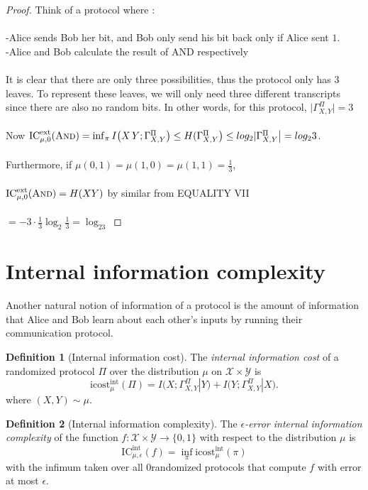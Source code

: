 \documentclass[11pt,oneside]{book}
\theoremstyle{plain}
\theoremstyle{definition}
\newtheorem{definition}{Definition}
\theoremstyle{plain}
\newcommand{\calX}{\mathcal{X}}
\newcommand{\calY}{\mathcal{Y}}
\newcommand{\ICext}{\mathrm{IC}^{\mathrm{ext}}}
\newcommand{\ICint}{\mathrm{IC}^{\mathrm{int}}}
\newcommand{\icostint}{\mathrm{icost}^{\mathrm{int}}}
\begin{document}
\begin{proof}
	Think of a protocol where :\\
	\\
	-Alice sends Bob her bit, and Bob only send his bit back only if Alice sent $1$.\\
	-Alice and Bob calculate the result of AND respectively \\
	\\
	It is clear that there are only three possibilities, thus the protocol only has $3$ leaves. To represent these leaves, we will only need three different transcripts since there are also no random bits. In other words, for this protocol, $|\Gamma_{X,Y}^\Pi \big| = 3$ \\
	\\
	Now $\ICext_{\mu,0}(\textsc{And}) = \inf_{\pi} I\big( X\,Y ; \Gamma_{X,Y}^\Pi \big) \le H(\Gamma_{X,Y}^\Pi \big) \le log_2|\Gamma_{X,Y}^\Pi \big| = log_23$.\\
	\\
	Furthermore, if $\mu(0,1) = \mu(1,0) = \mu(1,1) = \frac13$, \\
	\\
	$\ICext_{\mu,0}(\textsc{And}) = H(XY)$ by similar from EQUALITY VII\\
	\\
	$= -3\cdot\frac13\log_2\frac13 = \log_23$
\end{proof}


 
\section{Internal information complexity}

Another natural notion of information of a protocol is the amount of information that Alice and Bob learn about each other's inputs by running their communication protocol.

\begin{definition}[Internal information cost]
	The \emph{internal information cost} of a randomized protocol $\Pi$ over the distribution $\mu$ on $\calX \times \calY$ is
	\[
	\icostint_\mu(\Pi) = I\big( X ; \Gamma_{X,Y}^\Pi|Y\big) + I\big( Y ; \Gamma_{X,Y}^\Pi|X\big).
	\]
	where $(X,Y) \sim \mu$.
\end{definition}

\begin{definition}[Internal information complexity]
	The \emph{$\epsilon$-error internal information complexity} of the function $f : \calX \times \calY \to \{0,1\}$ with respect to the distribution $\mu$ is
	\[
	\ICint_{\mu,\epsilon}(f) = \inf_{\pi} \icostint_\mu(\pi)
	\]
	with the infimum taken over all 0randomized protocols that compute $f$ with error at most $\epsilon$.
\end{definition}
\end{document}
